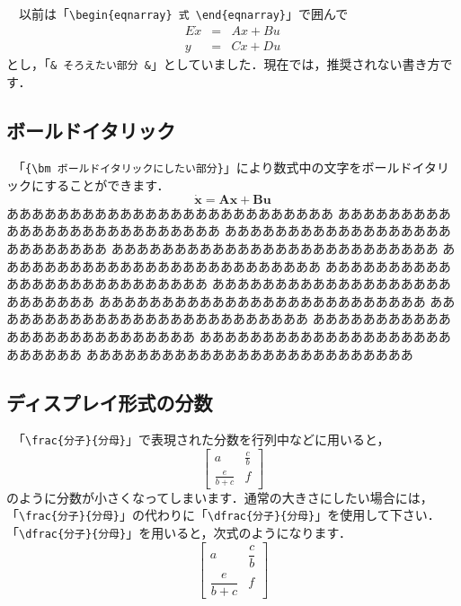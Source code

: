 　以前は「{\verb+\begin{eqnarray} 式 \end{eqnarray}+}」で囲んで
\begin{eqnarray}
	E\dot{x} &=& Ax + Bu \\
	y &=& Cx + Du
\end{eqnarray}
とし，「{\verb+& そろえたい部分 &+}」としていました．現在では，推奨されない書き方です．

\subsection{ボールドイタリック}
　「{\verb+{\bm ボールドイタリックにしたい部分}+}」により数式中の文字をボールドイタリックにすることができます．
\begin{equation}
	\dot{\bm x} = {\bm A}{\bm x} + {\bm B}{\bm u}
\end{equation}
ああああああああああああああああああああああああああ
ああああああああああああああああああああああああああ
ああああああああああああああああああああああああああ
ああああああああああああああああああああああああああ
ああああああああああああああああああああああああああ
ああああああああああああああああああああああああああ
ああああああああああああああああああああああああああ
ああああああああああああああああああああああああああ
ああああああああああああああああああああああああああ
ああああああああああああああああああああああああああ
ああああああああああああああああああああああああああ
ああああああああああああああああああああああああああ

\subsection{ディスプレイ形式の分数}
　「{\verb+\frac{分子}{分母}+}」で表現された分数を行列中などに用いると，
\begin{equation}
	\left[ \begin{array}{cc}
		a & \frac{c}{b} \\
		\frac{e}{b + c} & f
	\end{array} \right]
\end{equation}
のように分数が小さくなってしまいます．通常の大きさにしたい場合には，「{\verb+\frac{分子}{分母}+}」の代わりに「{\verb+\dfrac{分子}{分母}+}」を使用して下さい．「{\verb+\dfrac{分子}{分母}+}」を用いると，次式のようになります．
\begin{equation}
	\left[ \begin{array}{cc}
		a & \dfrac{c}{b} \\
		\dfrac{e}{b + c} & f
	\end{array} \right]
\end{equation}
